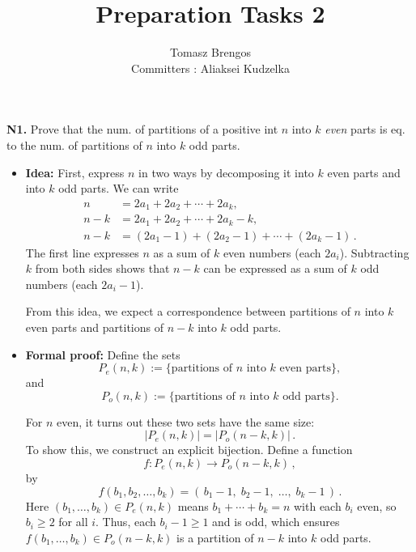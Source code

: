 \documentclass[docmute]{article}
\title{Preparation Tasks 2}
\author{Tomasz Brengos \\  
Committers : Aliaksei Kudzelka}
\date{}
\begin{document}
\maketitle

\noindent\textbf{N1.} Prove that the num. of partitions of a positive int $n$ into $k$ \textit{even} parts %
is eq. to the num. of partitions of $n$ into $k$ odd parts.

\begin{itemize}
  \item \textbf{Idea:} First, express $n$ in two ways by decomposing it into $k$ even parts and into $k$ odd parts. We can write 
  \begin{align*}
    n &= 2a_1 + 2a_2 + \cdots + 2a_k,\\
    n - k &= 2a_1 + 2a_2 + \cdots + 2a_k - k,\\
    n - k &= (2a_1 - 1) + (2a_2 - 1) + \cdots + (2a_k - 1)\,.
  \end{align*}
  The first line expresses $n$ as a sum of $k$ even numbers (each $2a_i$). Subtracting $k$ from both sides shows that $n-k$ can be expressed as a sum of $k$ odd numbers (each $2a_i - 1$). %
  
  From this idea, we expect a correspondence between partitions of $n$ into $k$ even parts and partitions of $n-k$ into $k$ odd parts.
  
  \item \textbf{Formal proof:} Define the sets 
  \[
    P_e(n,k) := \{\text{partitions of $n$ into $k$ even parts}\}, 
  \] 
  and 
  \[
    P_o(n,k) := \{\text{partitions of $n$ into $k$ odd parts}\}. 
  \] 
  
  For $n$ even, it turns out these two sets have the same size: 
  \[
    |P_e(n,k)| = |P_o(n-k,k)|\,.
  \] 
  To show this, we construct an explicit bijection. Define a function 
  \[
    f: P_e(n,k) \to P_o(n-k,k)\,,
  \] 
  by 
  \[
    f(b_1,b_2,\ldots,b_k) = (\,b_1 - 1,\; b_2 - 1,\; \ldots,\; b_k - 1\,)\,. 
  \] 
  Here $(b_1,\ldots,b_k) \in P_e(n,k)$ means $b_1 + \cdots + b_k = n$ with each $b_i$ even, so $b_i \ge 2$ for all $i$. Thus, each $b_i - 1 \ge 1$ and is odd, which ensures $f(b_1,\ldots,b_k) \in P_o(n-k,k)$ is a partition of $n-k$ into $k$ odd parts. %
  

\end{itemize}
\end{document}
